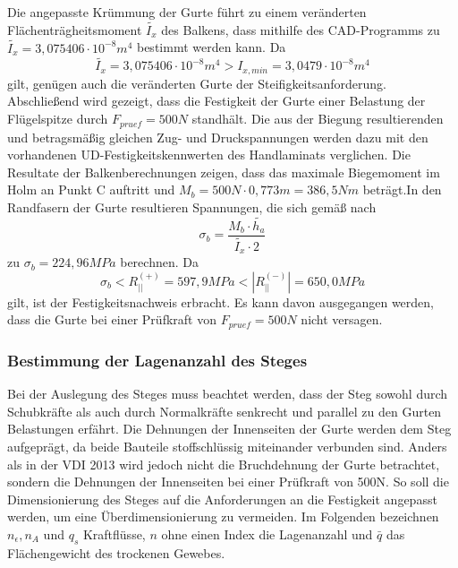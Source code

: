 \noindent Die angepasste Krümmung der Gurte führt zu einem veränderten Flächenträgheitsmoment $ \tilde{I_{x}} $ des Balkens, dass mithilfe des CAD-Programms zu $ \tilde{I_{x}}=3,075406\cdot 10^{-8}m^{4} $ bestimmt werden kann. Da 
\begin{equation}
	\label{IVergleich}
	\tilde{I_{x}}=3,075406\cdot 10^{-8}m^{4} > I_{x,min}=3,0479\cdot 10^{-8}m^{4}
\end{equation}
gilt, genügen auch die veränderten Gurte der Steifigkeitsanforderung.\\
 
\noindent Abschließend wird gezeigt, dass die Festigkeit der Gurte einer Belastung der Flügelspitze durch $ F_{pruef}=500N $ standhält. Die aus der Biegung resultierenden und betragsmäßig gleichen Zug- und Druckspannungen werden dazu mit den vorhandenen UD-Festigkeitskennwerten des Handlaminats verglichen. Die Resultate der Balkenberechnungen zeigen, dass das maximale Biegemoment im Holm an Punkt C auftritt und $ M_{b}=500N\cdot 0,773m=386,5Nm $ beträgt.In den Randfasern der Gurte resultieren Spannungen, die sich gemäß \cite{item15} nach\\
\begin{equation}
	\sigma_{b}=\frac{M_{b}\cdot \tilde{h_{a}}}{\tilde{I_{x}}\cdot 2}
\end{equation} 
zu $ \sigma_{b}=224,96MPa $ berechnen. Da 
\begin{equation}
	\sigma_{b}< R^{(+)}_{||}=597,9 MPa < |R^{(-)}_{||}| =650,0 MPa
\end{equation} 
gilt, ist der Festigkeitsnachweis erbracht. Es kann davon ausgegangen werden, dass die Gurte bei einer Prüfkraft von $ F_{pruef}=500N $ nicht versagen. \\

\subsubsection{Bestimmung der Lagenanzahl des Steges}
Bei der Auslegung des Steges muss beachtet werden, dass der Steg sowohl durch Schubkräfte als auch durch Normalkräfte senkrecht und parallel zu den Gurten Belastungen erfährt. Die Dehnungen der Innenseiten der Gurte werden dem Steg aufgeprägt, da beide Bauteile stoffschlüssig miteinander verbunden sind. Anders als in der VDI 2013 wird jedoch nicht die Bruchdehnung der Gurte betrachtet, sondern die Dehnungen der Innenseiten bei einer Prüfkraft von 500N. So soll die Dimensionierung des Steges auf die Anforderungen an die Festigkeit angepasst werden, um eine Überdimensionierung zu vermeiden. Im Folgenden bezeichnen $ n_{\epsilon}, n_{A} $ und $ q_{s} $ Kraftflüsse, $ n $ ohne einen Index die Lagenanzahl und $ \bar{q} $ das Flächengewicht des trockenen Gewebes.\\

